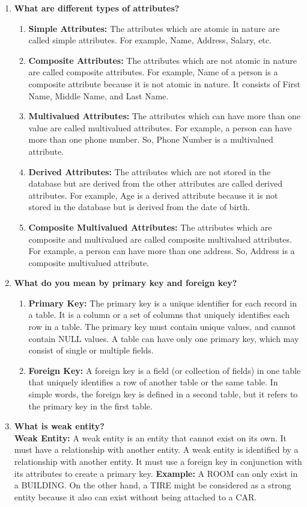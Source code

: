 \documentclass[11pt]{article}
\begin{document}
\begin{enumerate}
	\item \textbf{What are different types of attributes?}
	      \begin{enumerate}
		      \item \textbf{Simple Attributes:} The attributes which are atomic in nature are called simple attributes. For example, Name, Address, Salary, etc.
		      \item \textbf{Composite Attributes:} The attributes which are not atomic in nature are called composite attributes. For example, Name of a person is a composite attribute because it is not atomic in nature. It consists of First Name, Middle Name, and Last Name.
		      \item \textbf{Multivalued Attributes:} The attributes which can have more than one value are called multivalued attributes. For example, a person can have more than one phone number. So, Phone Number is a multivalued attribute.
		      \item \textbf{Derived Attributes:} The attributes which are not stored in the database but are derived from the other attributes are called derived attributes. For example, Age is a derived attribute because it is not stored in the database but is derived from the date of birth.
		      \item \textbf{Composite Multivalued Attributes:} The attributes which are composite and multivalued are called composite multivalued attributes. For example, a person can have more than one address. So, Address is a composite multivalued attribute.
	      \end{enumerate}
	\item \textbf{What do you mean by primary key and foreign key?}

	      \begin{enumerate}
		      \item \textbf{Primary Key:} The primary key is a unique identifier for each record in a table. It is a column or a set of columns that uniquely identifies each row in a table. The primary key must contain unique values, and cannot contain NULL values. A table can have only one primary key, which may consist of single or multiple fields.
		      \item \textbf{Foreign Key:} A foreign key is a field (or collection of fields) in one table that uniquely identifies a row of another table or the same table. In simple words, the foreign key is defined in a second table, but it refers to the primary key in the first table.
	      \end{enumerate}
	\item \textbf{What is weak entity?}\\
	      \textbf{Weak Entity:} A weak entity is an entity that cannot exist on its own. It must have a relationship with another entity. A weak entity is identified by a relationship with another entity. It must use a foreign key in conjunction with its attributes to create a primary key.
	      \textbf{Example: }
	      A ROOM can only exist in a BUILDING. On the other hand, a TIRE might be considered as a strong entity because it also can exist without being attached to a CAR.
\end{enumerate}
\end{document}
